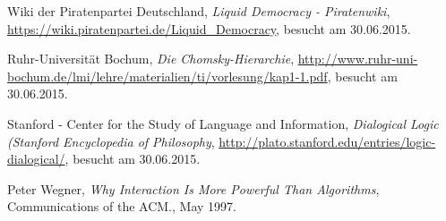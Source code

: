 \documentclass[11pt,a4paper,bibtotocnumbered]{scrreprt}
\begin{document}
\begin{singlespace}
\begin{thebibliography}{9}
  Wiki der Piratenpartei Deutschland,
  \emph{Liquid Democracy - Piratenwiki},
  \url{https://wiki.piratenpartei.de/Liquid_Democracy},
  besucht am 30.06.2015.

  Ruhr-Universit{\"a}t Bochum,
  \emph{Die Chomsky-Hierarchie},
  \url{http://www.ruhr-uni-bochum.de/lmi/lehre/materialien/ti/vorlesung/kap1-1.pdf},
  besucht am 30.06.2015.

  Stanford - Center for the Study of Language and Information,
  \emph{Dialogical Logic (Stanford Encyclopedia of Philosophy},
  \url{http://plato.stanford.edu/entries/logic-dialogical/},
  besucht am 30.06.2015.
  
  Peter Wegner,
  \emph{Why Interaction Is More Powerful Than Algorithms},
  Communications of the ACM.,
  May 1997.

\end{thebibliography}
\end{singlespace}
\end{document}
